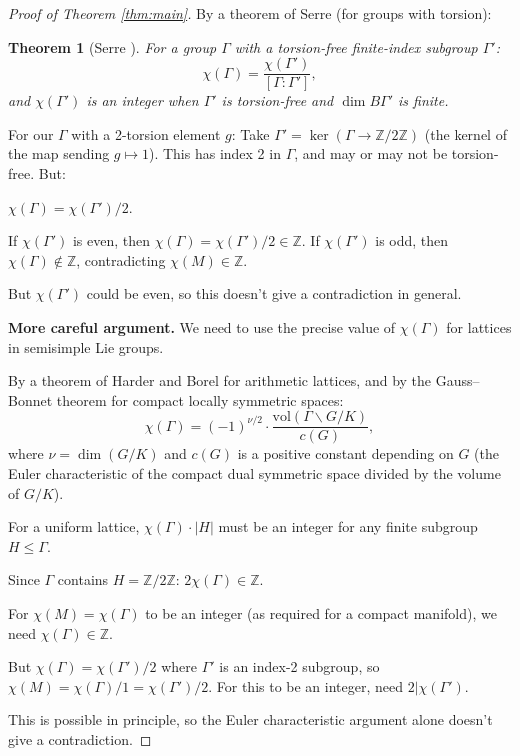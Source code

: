 \documentclass[12pt]{article}
\newtheorem{theorem}{Theorem}
\begin{document}
\begin{proof}[Proof of Theorem \ref{thm:main}]
By a theorem of Serre \cite{Serre1971} (for groups with torsion):
\begin{theorem}[Serre \cite{Serre1971}]\label{thm:serre}
For a group $\Gamma$ with a torsion-free finite-index subgroup $\Gamma'$:
\[
\chi(\Gamma) = \frac{\chi(\Gamma')}{[\Gamma : \Gamma']},
\]
and $\chi(\Gamma')$ is an integer when $\Gamma'$ is torsion-free and $\dim B\Gamma'$ is finite.
\end{theorem}

For our $\Gamma$ with a 2-torsion element $g$: Take $\Gamma' = \ker(\Gamma \to \mathbb{Z}/2\mathbb{Z})$ (the kernel of the map sending $g \mapsto 1$). This has index 2 in $\Gamma$, and may or may not be torsion-free. But:

$\chi(\Gamma) = \chi(\Gamma')/2$.

If $\chi(\Gamma')$ is even, then $\chi(\Gamma) = \chi(\Gamma')/2 \in \mathbb{Z}$.
If $\chi(\Gamma')$ is odd, then $\chi(\Gamma) \notin \mathbb{Z}$, contradicting $\chi(M) \in \mathbb{Z}$.

But $\chi(\Gamma')$ could be even, so this doesn't give a contradiction in general.

\textbf{More careful argument.} We need to use the precise value of $\chi(\Gamma)$ for lattices in semisimple Lie groups.

By a theorem of Harder \cite{Harder1971} and Borel \cite{Borel1974} for arithmetic lattices, and by the Gauss--Bonnet theorem for compact locally symmetric spaces:
\[
\chi(\Gamma) = (-1)^{\nu/2} \cdot \frac{\text{vol}(\Gamma \backslash G / K)}{c(G)},
\]
where $\nu = \dim(G/K)$ and $c(G)$ is a positive constant depending on $G$ (the Euler characteristic of the compact dual symmetric space divided by the volume of $G/K$).

For a uniform lattice, $\chi(\Gamma) \cdot |H|$ must be an integer for any finite subgroup $H \leq \Gamma$.

Since $\Gamma$ contains $H = \mathbb{Z}/2\mathbb{Z}$: $2\chi(\Gamma) \in \mathbb{Z}$.

For $\chi(M) = \chi(\Gamma)$ to be an integer (as required for a compact manifold), we need $\chi(\Gamma) \in \mathbb{Z}$.

But $\chi(\Gamma) = \chi(\Gamma')/2$ where $\Gamma'$ is an index-2 subgroup, so $\chi(M) = \chi(\Gamma)/1 = \chi(\Gamma')/2$. For this to be an integer, need $2 | \chi(\Gamma')$.

This is possible in principle, so the Euler characteristic argument alone doesn't give a contradiction.


\end{proof}
\end{document}
